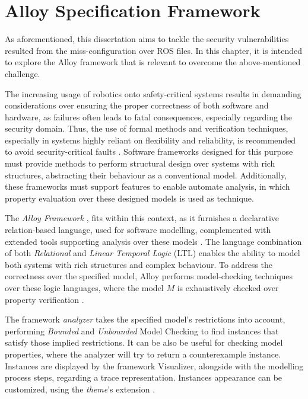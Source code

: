 \chapter{Alloy Specification Framework}\label{c:alloy}

As aforementioned, this dissertation aims to tackle the security vulnerabilities resulted from the miss-configuration over ROS files. In this chapter, it is intended to explore the Alloy framework that is relevant to overcome the above-mentioned challenge. %

The increasing usage of robotics onto safety-critical systems results in demanding considerations over ensuring the proper correctness of both software and hardware, as failures often leads to fatal consequences, especially regarding the security domain. Thus, the use of formal methods and verification techniques, especially in systems highly reliant on flexibility and reliability, is recommended to avoid security-critical faults \cite{clarke2011model}. Software frameworks designed for this purpose must provide methods to perform structural design over systems with rich structures, abstracting their behaviour as a conventional model. Additionally, these frameworks must support features to enable automate analysis, in which property evaluation over these designed models is used as technique. 

The \textit{Alloy Framework} \cite{alloy-DJ}, fits within this context, as it furnishes a declarative relation-based language, used for software modelling, complemented with extended tools supporting analysis over these models \cite{alloy-6}. The language combination of both \textit{Relational} and \textit{Linear Temporal Logic} (LTL) enables the ability to model both systems with rich structures and complex behaviour. To address the correctness over the specified model, Alloy performs model-checking techniques over these logic languages, where the model $M$ is exhaustively checked over property verification \cite{lwspecification}.

The framework \textit{analyzer} takes the specified model's restrictions into account, performing \textit{Bounded} and \textit{Unbounded} Model Checking to find instances that satisfy those implied restrictions. It can be also be useful for checking model properties, where the analyzer will try to return a counterexample instance. Instances are displayed by the framework Visualizer, alongside with the modelling process steps, regarding a trace representation. Instances appearance can be customized, using the \textit{theme}'s extension \cite{alloy-6}.

